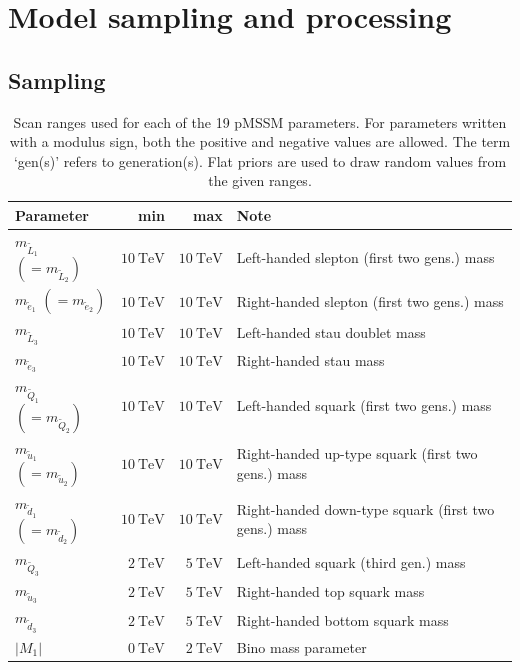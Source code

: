 \section{Model sampling and processing}\label{sec:pmssm_sampling}


\subsection{Sampling}

\begin{table}
	\centering
	\small
	\caption{Scan ranges used for each of the 19 pMSSM parameters. For parameters written with a modulus sign, both the positive and negative values are allowed. The term `gen(s)' refers to generation(s). Flat priors are used to draw random values from the given ranges.}
	\setlength\heavyrulewidth{0.2ex}
	\begin{tabular} {l r r l}
		\toprule
		Parameter & min & max & Note \\ 
		\midrule
		$m_{\tilde{L}_1}$ $(=m_{\tilde{L}_2})$ & $\SI{10}{\TeV}$ & $\SI{10}{\TeV}$ & Left-handed slepton (first two gens.) mass \\
		$m_{\tilde{e}_1}$ $(=m_{\tilde{e}_2})$ & $\SI{10}{\TeV}$ & $\SI{10}{\TeV}$ & Right-handed slepton (first two gens.) mass \\ 
		$m_{\tilde{L}_3}$ & $\SI{10}{\TeV}$ & $\SI{10}{\TeV}$ & Left-handed stau doublet mass \\
		$m_{\tilde{e}_3}$ & $\SI{10}{\TeV}$ & $\SI{10}{\TeV}$ & Right-handed stau mass \\
		\midrule
		$m_{\tilde{Q}_1}$ $(=m_{\tilde{Q}_2})$ & $\SI{10}{\TeV}$ & $\SI{10}{\TeV}$ & Left-handed squark (first two gens.) mass \\
		$m_{\tilde{u}_1}$ $(=m_{\tilde{u}_2})$ & $\SI{10}{\TeV}$ & $\SI{10}{\TeV}$ & Right-handed up-type squark (first two gens.) mass \\
		$m_{\tilde{d}_1}$ $(=m_{\tilde{d}_2})$ &$\SI{10}{\TeV}$ & $\SI{10}{\TeV}$ & Right-handed down-type squark (first two gens.) mass \\
		$m_{\tilde{Q}_3}$ & $\SI{2}{\TeV}$ & $\SI{5}{\TeV}$ & Left-handed squark (third gen.) mass \\
		$m_{\tilde{u}_3}$ & $\SI{2}{\TeV}$ & $\SI{5}{\TeV}$ & Right-handed top squark mass \\
		$m_{\tilde{d}_3}$ & $\SI{2}{\TeV}$ & $\SI{5}{\TeV}$ & Right-handed bottom squark mass \\
		\midrule
		$\vert M_1\vert$ & $\SI{0}{\TeV}$ & $\SI{2}{\TeV}$ & Bino mass parameter \\

\end{tabular}
\end{table}
